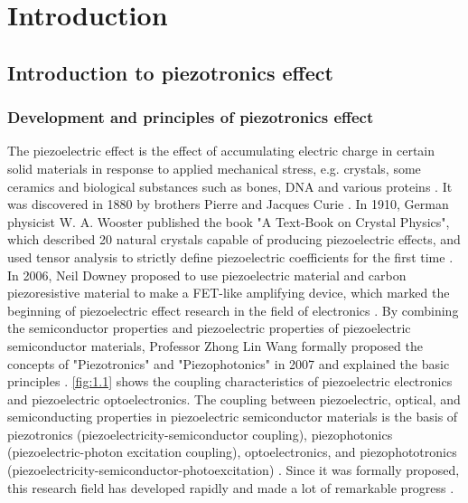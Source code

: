 
\chapter{Introduction}  %
\label{ch:Introduction}

\ifpdf
    \graphicspath{{Chapter1/Figs/Raster/}{Chapter1/Figs/PDF/}{Chapter1/Figs/}}
\else
    \graphicspath{{Chapter1/Figs/Vector/}{Chapter1/Figs/}}
\fi


\section{Introduction to piezotronics effect} %
\subsection{Development and principles of piezotronics effect}

The piezoelectric effect  is the effect of accumulating electric charge in certain solid materials in response to applied mechanical stress, e.g. crystals, some ceramics and biological substances such as bones, DNA and various proteins \cite{skoog2017principles}. It was discovered in 1880 by brothers Pierre and Jacques Curie \cite{jacques1880development}. In 1910, German physicist W. A. Wooster published the book "A Text-Book on Crystal  Physics", which described 20 natural crystals capable of producing  piezoelectric effects, and used tensor analysis to strictly define piezoelectric coefficients  for the first time \cite{voigt1910lehrbuch}. In 2006, Neil Downey proposed to use piezoelectric material and carbon piezoresistive material to make a FET-like amplifying device, which marked the beginning of piezoelectric effect research in the field of electronics \cite{downie2006exploding}. By combining the semiconductor properties and piezoelectric properties of piezoelectric semiconductor materials, Professor Zhong Lin Wang formally proposed the concepts of "Piezotronics" and "Piezophotonics" in 2007 and explained the basic principles \cite{wang2007nanopiezotronics}. \autoref{fig:1.1} shows the coupling characteristics of piezoelectric electronics and piezoelectric optoelectronics. The coupling between piezoelectric, optical, and semiconducting properties in piezoelectric semiconductor materials is the basis of  piezotronics (piezoelectricity-semiconductor coupling), piezophotonics (piezoelectric-photon excitation coupling), optoelectronics, and piezophototronics (piezoelectricity-semiconductor-photoexcitation) \cite{wu2016piezotronics}. Since it was formally proposed, this research field has developed rapidly and made a lot of remarkable progress \cite{wang2018piezotronics,hinchet2018piezoelectric,hu2018piezotronic}.

